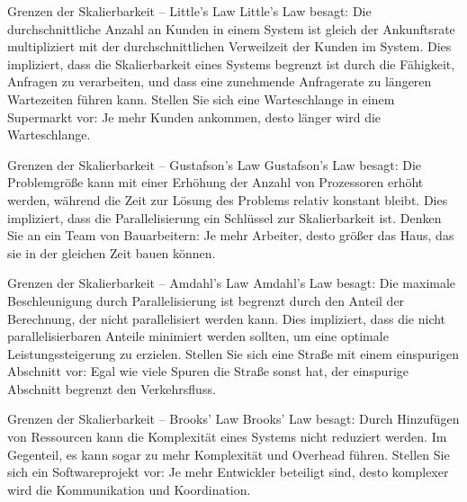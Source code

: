 \documentclass{beamer}
\begin{document}
\begin{frame}{Grenzen der Skalierbarkeit -- Little's Law}
    Little's Law besagt: Die durchschnittliche Anzahl an Kunden in einem System ist gleich der Ankunftsrate multipliziert mit der durchschnittlichen Verweilzeit der Kunden im System.  Dies impliziert, dass die Skalierbarkeit eines Systems begrenzt ist durch die Fähigkeit, Anfragen zu verarbeiten, und dass eine zunehmende Anfragerate zu längeren Wartezeiten führen kann.  Stellen Sie sich eine Warteschlange in einem Supermarkt vor: Je mehr Kunden ankommen, desto länger wird die Warteschlange.
\end{frame}

\begin{frame}{Grenzen der Skalierbarkeit -- Gustafson's Law}
Gustafson's Law besagt: Die Problemgröße kann mit einer Erhöhung der Anzahl von Prozessoren erhöht werden, während die Zeit zur Lösung des Problems relativ konstant bleibt. Dies impliziert, dass die Parallelisierung ein Schlüssel zur Skalierbarkeit ist.  Denken Sie an ein Team von Bauarbeitern:  Je mehr Arbeiter, desto größer das Haus, das sie in der gleichen Zeit bauen können.
\end{frame}

\begin{frame}{Grenzen der Skalierbarkeit -- Amdahl's Law}
    Amdahl's Law besagt:  Die maximale Beschleunigung durch Parallelisierung ist begrenzt durch den Anteil der Berechnung, der nicht parallelisiert werden kann.  Dies impliziert, dass die nicht parallelisierbaren Anteile minimiert werden sollten, um eine optimale Leistungssteigerung zu erzielen.  Stellen Sie sich eine Straße mit einem einspurigen Abschnitt vor:  Egal wie viele Spuren die Straße sonst hat, der einspurige Abschnitt begrenzt den Verkehrsfluss.

\end{frame}

\begin{frame}{Grenzen der Skalierbarkeit -- Brooks' Law}
 Brooks' Law besagt: Durch Hinzufügen von Ressourcen kann die Komplexität eines Systems nicht reduziert werden.  Im Gegenteil, es kann sogar zu mehr Komplexität und Overhead führen.  Stellen Sie sich ein Softwareprojekt vor: Je mehr Entwickler beteiligt sind, desto komplexer wird die Kommunikation und Koordination.
\end{frame}
\end{document}
